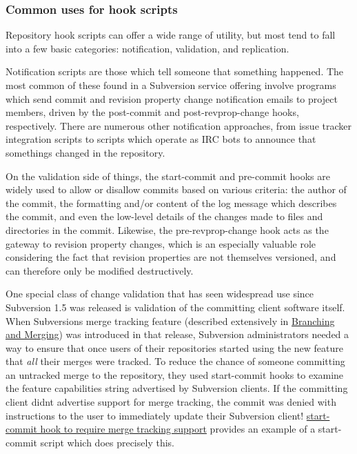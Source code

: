 \subsubsection{Common uses for hook
scripts}\label{svn.reposadmin.hooks.uses}

Repository hook scripts can offer a wide range of utility, but most tend
to fall into a few basic categories: notification, validation, and
replication.

Notification scripts are those which tell someone that something
happened. The most common of these found in a Subversion service
offering involve programs which send commit and revision property change
notification emails to project members, driven by the post-commit and
post-revprop-change hooks, respectively. There are numerous other
notification approaches, from issue tracker integration scripts to
scripts which operate as IRC bots to announce that
something\textquotesingle s changed in the repository.

On the validation side of things, the start-commit and pre-commit hooks
are widely used to allow or disallow commits based on various criteria:
the author of the commit, the formatting and/or content of the log
message which describes the commit, and even the low-level details of
the changes made to files and directories in the commit. Likewise, the
pre-revprop-change hook acts as the gateway to revision property
changes, which is an especially valuable role considering the fact that
revision properties are not themselves versioned, and can therefore only
be modified destructively.

One special class of change validation that has seen widespread use
since Subversion 1.5 was released is validation of the committing client
software itself. When Subversion\textquotesingle s merge tracking
feature (described extensively in \hyperref[svn.branchmerge]{Branching
and Merging}) was introduced in that release, Subversion administrators
needed a way to ensure that once users of their repositories started
using the new feature that \emph{all} their merges were tracked. To
reduce the chance of someone committing an untracked merge to the
repository, they used start-commit hooks to examine the feature
capabilities string advertised by Subversion clients. If the committing
client didn\textquotesingle t advertise support for merge tracking, the
commit was denied with instructions to the user to immediately update
their Subversion client!
\hyperref[svn.reposadmin.hooks.uses.ex-1]{start-commit hook to require
merge tracking support} provides an example of a start-commit script
which does precisely this.

